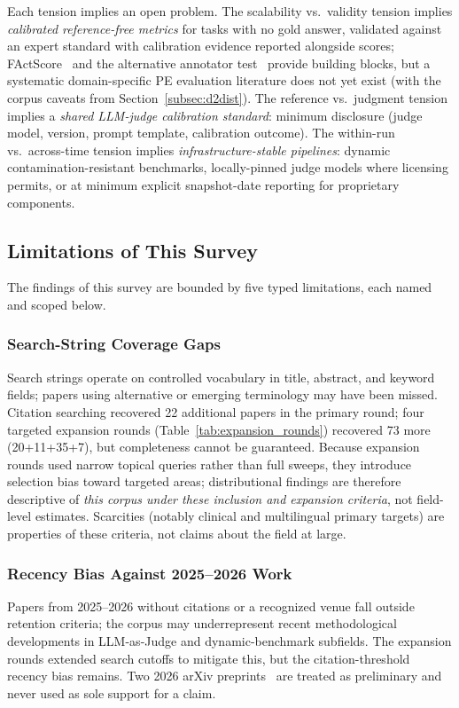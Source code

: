 \documentclass[acmsmall, nonacm, screen]{acmart}
\begin{document}
Each tension implies an open problem. The scalability vs.\ validity
tension implies \textit{calibrated reference-free metrics} for tasks
with no gold answer, validated against an expert standard with
calibration evidence reported alongside scores;
FActScore~\cite{factscore2023} and the alternative annotator
test~\cite{alternativeannotator2025} provide building blocks, but a
systematic domain-specific PE evaluation literature does not yet
exist (with the corpus caveats from Section~\ref{subsec:d2dist}).
The reference vs.\ judgment tension implies a \textit{shared LLM-judge
calibration standard}: minimum disclosure (judge model, version,
prompt template, calibration outcome). The within-run vs.\
across-time tension implies \textit{infrastructure-stable pipelines}:
dynamic contamination-resistant benchmarks, locally-pinned judge
models where licensing permits, or at minimum explicit snapshot-date
reporting for proprietary components.

\subsection{Limitations of This Survey}
\label{subsec:surveylimits}

The findings of this survey are bounded by five typed limitations,
each named and scoped below.

\subsubsection{Search-String Coverage Gaps}
\label{subsubsec:lim_search}
Search strings operate on controlled vocabulary in title, abstract,
and keyword fields; papers using alternative or emerging terminology
may have been missed. Citation searching recovered 22 additional
papers in the primary round; four targeted expansion rounds
(Table~\ref{tab:expansion_rounds}) recovered 73 more (20+11+35+7),
but completeness cannot be guaranteed. Because expansion rounds
used narrow topical queries rather than full sweeps, they introduce
selection bias toward targeted areas; distributional findings are
therefore descriptive of \emph{this corpus under these inclusion and
expansion criteria}, not field-level estimates. Scarcities
(notably clinical and multilingual primary targets) are properties
of these criteria, not claims about the field at large.

\subsubsection{Recency Bias Against 2025--2026 Work}
\label{subsubsec:lim_recency}
Papers from 2025--2026 without citations or a recognized venue fall
outside retention criteria; the corpus may underrepresent recent
methodological developments in LLM-as-Judge and dynamic-benchmark
subfields. The expansion rounds extended search cutoffs to mitigate
this, but the citation-threshold recency bias remains. Two 2026
arXiv preprints~\cite{bellibatlu2026judgesense, benchmark2sq2026}
are treated as preliminary and never used as sole support for a
claim.
\end{document}
